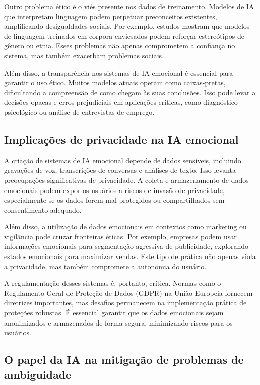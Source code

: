 \documentclass[a4paper,12pt]{report}
\begin{document}
	Outro problema ético é o viés presente nos dados de treinamento. Modelos de IA que interpretam linguagem podem perpetuar preconceitos existentes, amplificando desigualdades sociais. Por exemplo, estudos mostram que modelos de linguagem treinados em corpora enviesados podem reforçar estereótipos de gênero ou etnia. Esses problemas não apenas comprometem a confiança no sistema, mas também exacerbam problemas sociais.
	
	Além disso, a transparência nos sistemas de IA emocional é essencial para garantir o uso ético. Muitos modelos atuais operam como caixas-pretas, dificultando a compreensão de como chegam às suas conclusões. Isso pode levar a decisões opacas e erros prejudiciais em aplicações críticas, como diagnóstico psicológico ou análise de entrevistas de emprego.
	
	\subsection{Implicações de privacidade na IA emocional}
	
	A criação de sistemas de IA emocional depende de dados sensíveis, incluindo gravações de voz, transcrições de conversas e análises de texto. Isso levanta preocupações significativas de privacidade. A coleta e armazenamento de dados emocionais podem expor os usuários a riscos de invasão de privacidade, especialmente se os dados forem mal protegidos ou compartilhados sem consentimento adequado.
	
	Além disso, a utilização de dados emocionais em contextos como marketing ou vigilância pode cruzar fronteiras éticas. Por exemplo, empresas podem usar informações emocionais para segmentação agressiva de publicidade, explorando estados emocionais para maximizar vendas. Este tipo de prática não apenas viola a privacidade, mas também compromete a autonomia do usuário.
	
	A regulamentação desses sistemas é, portanto, crítica. Normas como o Regulamento Geral de Proteção de Dados (GDPR) na União Europeia fornecem diretrizes importantes, mas desafios permanecem na implementação prática de proteções robustas. É essencial garantir que os dados emocionais sejam anonimizados e armazenados de forma segura, minimizando riscos para os usuários.
	
	\subsection{O papel da IA na mitigação de problemas de ambiguidade}
	
\end{document}
